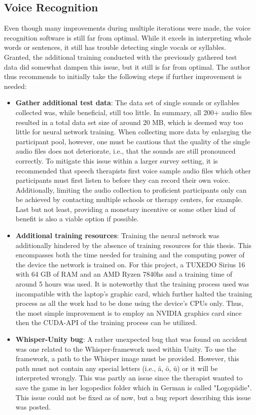 \documentclass[draft,final]{vutinfth} %
\begin{document}
\subsection{Voice Recognition}
Even though many improvements during multiple iterations were made, the voice recognition software is still far from optimal. While it excels in interpreting whole words or sentences, it still has trouble detecting single vocals or syllables. Granted, the additional training conducted with the previously gathered test data did somewhat dampen this issue, but it still is far from optimal. The author thus recommends to initially take the following steps if further improvement is needed:
\begin{itemize}
\item \textbf{Gather additional test data}: The data set of single sounds or syllables collected was, while beneficial, still too little. In summary, all 200+ audio files resulted in a total data set size of around 20 MB, which is deemed way too little for neural network training. When collecting more data by enlarging the participant pool, however, one must be cautious that the quality of the single audio files does not deteriorate, i.e., that the sounds are still pronounced correctly. To mitigate this issue within a larger survey setting, it is recommended that speech therapists first voice sample audio files which other participants must first listen to before they can record their own voice. Additionally, limiting the audio collection to proficient participants only can be achieved by contacting multiple schools or therapy centers, for example. Last but not least, providing a monetary incentive or some other kind of benefit is also a viable option if possible. 

\item \textbf{Additional training resources}: Training the neural network was additionally hindered by the absence of training resources for this thesis. This encompasses both the time needed for training and the computing power of the device the network is trained on. For this project, a TUXEDO Sirius 16 with 64 GB of RAM and an AMD Ryzen 7840hs and a training time of around 5 hours was used. It is noteworthy that the training process used was incompatible with the laptop's graphic card, which further halted the training process as all the work had to be done using the device's CPUs only. Thus, the most simple improvement is to employ an NVIDIA graphics card since then the CUDA-API of the training process can be utilized.

\item \textbf{Whisper-Unity bug}: A rather unexpected bug that was found on accident was one related to the Whisper-framework used within Unity. To use the framework, a path to the Whisper image must be provided. However, this path must not contain any special letters (i.e., ä, ö, ü) or it will be interpreted wrongly. This was partly an issue since the therapist wanted to save the game in her logopedics folder which in German is called "Logopädie". This issue could not be fixed as of now, but a bug report describing this issue was posted.
\end{itemize}
\end{document}
